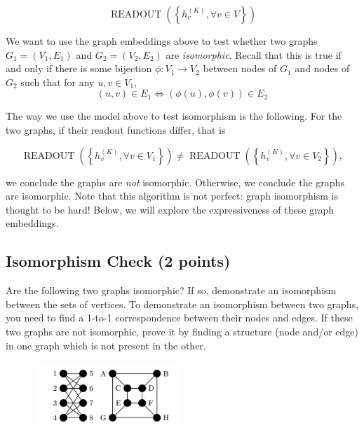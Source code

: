 \documentclass{article}
\numberwithin{figure}{section}
\begin{document}
$$\operatorname { READOUT }\left(\left\{h_v^{(K)}, \forall v \in V\right\}\right)$$

We want to use the graph embeddings above to test whether two graphs $G_1 = (V_1, E_1)$ and $G_2 = (V_2, E_2)$ are \textit{isomorphic}.
Recall that this is true if and only if there is some bijection $\phi : V_1 \rightarrow V_2$ between nodes of $G_1$ and nodes of $G_2$ such that for any $u, v \in V_1$, 
$$(u, v) \in E_1 \Leftrightarrow (\phi(u), \phi(v)) \in E_2$$

The way we use the model above to test isomorphism is the following. For the two graphs, if their readout functions differ, that is 

$$\operatorname { READOUT }\left(\left\{h_v^{(K)}, \forall v \in V_1\right\}\right) \neq \operatorname { READOUT }\left(\left\{h_v^{(K)}, \forall v \in V_2\right\}\right),$$

we conclude the graphs are \textit{not} isomorphic. Otherwise, we conclude the graphs are isomorphic. Note that this algorithm is not perfect: graph isomorphism is thought to be hard! Below, we will explore the expressiveness of these graph embeddings. 

\subsection{Isomorphism Check (2 points)}
Are the following two graphs isomorphic? If so, demonstrate an isomorphism
between the sets of vertices. To demonstrate an isomorphism between two
graphs, you need to find a 1-to-1 correspondence between their nodes and edges.
If these two graphs are not isomorphic, prove it by finding a structure (node
and/or edge) in one graph which is not present in the other. 
    \begin{figure}[H]
        \centering
        \includegraphics[width=0.5\textwidth]{CS224W_Homework1/fig1.png}
        \label{fig:my_label2}
    \end{figure}
\end{document}
